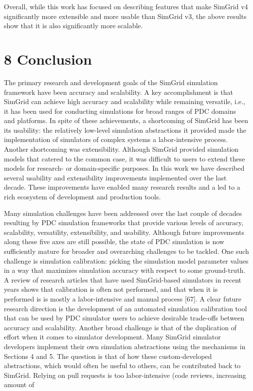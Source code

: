 \documentclass[
]{article}
\begin{document}
Overall, while this work has focused on describing features that make
SimGrid v4 significantly more extensible and more usable than SimGrid
v3, the above results show that it is also significantly more scalable.

\section{8 Conclusion}\label{conclusion}

The primary research and development goals of the SimGrid simulation
framework have been accuracy and scalability. A key accomplishment is
that SimGrid can achieve high accuracy and scalability while remaining
versatile, i.e., it has been used for conducting simulations for broad
ranges of PDC domains and platforms. In spite of these achievements, a
shortcoming of SimGrid has been its usability: the relatively low-level
simulation abstractions it provided made the implementation of
simulators of complex systems a labor-intensive process. Another
shortcoming was extensibility. Although SimGrid provided simulation
models that catered to the common case, it was difficult to users to
extend these models for research- or domain-specific purposes. In this
work we have described several usability and extensibility improvements
implemented over the last decade. These improvements have enabled many
research results and a led to a rich ecosystem of development and
production tools.

Many simulation challenges have been addressed over the last couple of
decades resulting by PDC simulation frameworks that provide various
levels of accuracy, scalability, versatility, extensibility, and
usability. Although future improvements along these five axes are still
possible, the state of PDC simulation is now sufficiently mature for
broader and overarching challenges to be tackled. One such challenge is
simulation calibration: picking the simulation model parameter values in
a way that maximizes simulation accuracy with respect to some
ground-truth. A review of research articles that have used SimGrid-based
simulators in recent years shows that calibration is often not
performed, and that when it is performed is is mostly a labor-intensive
and manual process {[}67{]}. A clear future research direction is the
development of an automated simulation calibration tool that can be used
by PDC simulator users to achieve desirable trade-offs between accuracy
and scalability. Another broad challenge is that of the duplication of
effort when it comes to simulator development. Many SimGrid simulator
developers implement their own simulation abstractions using the
mechanisms in Sections 4 and 5. The question is that of how these
custom-developed abstractions, which would often be useful to others,
can be contributed back to SimGrid. Relying on pull requests is too
labor-intensive (code reviews, increasing amount of
\end{document}
